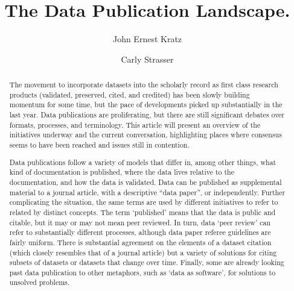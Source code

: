 \documentclass[10pt,twocolumn]{article}
\begin{document}
\title{The Data Publication Landscape.}
\author[1]{John Ernest Kratz}
\author[1]{Carly Strasser}

\maketitle
\thispagestyle{fancy}


\begin{abstract}


The movement to incorporate datasets into the scholarly record as first class research products (validated, preserved, cited, and credited) has been slowly building momentum for some time, but the pace of developments picked up substantially in the last year.
Data publications are proliferating, but there are still significant debates over formats, processes, and terminology.
This article will present an overview of the initiatives underway and the current conversation, highlighting places where consensus seems to have been reached and issues still in contention.

Data publications follow a variety of models that differ in, among other things, what kind of documentation is published, where the data lives relative to the documentation, and how the data is validated.
Data can be published as supplemental material to a journal article, with a descriptive ``data paper'', or independently.
Further complicating the situation, the same terms are used by different initiatives to refer to related by distinct concepts.
The term `published' means that the data is public and citable, but it may or may not mean peer reviewed.
In turn, data `peer review' can refer to substantially different processes, although data paper referee guidelines are fairly uniform.
There is substantial agreement on the elements of a dataset citation (which closely resembles that of a journal article) but a variety of solutions for citing subsets of datasets or datasets that change over time.
Finally, some are already looking past data publication to other metaphors, such as `data as software', for solutions to unsolved problems.

\end{abstract}
\clearpage
\end{document}
